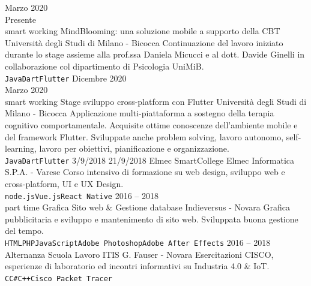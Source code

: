 \documentclass[9pt]{developercv}
\begin{document}
\begin{entrylist}
	\entry
		{Marzo 2020 \\ Presente \\\footnotesize{smart working}}
		{MindBlooming: una soluzione mobile a supporto della CBT}
		{Università degli Studi di Milano - Bicocca}
		{Continuazione del lavoro iniziato durante lo stage assieme alla prof.ssa Daniela Micucci e al dott. Davide Ginelli in collaborazione col dipartimento di Psicologia UniMiB. \\ \texttt{Java}\slashsep\texttt{Dart}\slashsep\texttt{Flutter}}
	\entry
		{Dicembre 2020 \\ Marzo 2020\\\footnotesize{smart working}}
		{Stage sviluppo cross-platform con Flutter}
		{Università degli Studi di Milano - Bicocca}
		{Applicazione multi-piattaforma a sostegno della terapia cognitivo comportamentale. Acquisite ottime conoscenze dell'ambiente mobile e del framework Flutter. Sviluppate anche problem solving, lavoro autonomo, self-learning, lavoro per obiettivi, pianificazione e organizzazione. \\ \texttt{Java}\slashsep\texttt{Dart}\slashsep\texttt{Flutter}}
	\entry
		{3/9/2018  21/9/2018}
		{Elmec SmartCollege}
		{Elmec Informatica S.P.A. - Varese}
		{Corso intensivo di formazione su web design, sviluppo web e cross-platform, UI e UX Design. \\ \texttt{node.js}\slashsep\texttt{Vue.js}\slashsep\texttt{React Native}}
	\entry
		{2016 -- 2018\\\footnotesize{part time}}
		{Grafica Sito web \& Gestione database}
		{Indieversus - Novara}
		{Grafica pubblicitaria e sviluppo e mantenimento di sito web. Sviluppata buona gestione del tempo. \\ \texttt{HTML}\slashsep\texttt{PHP}\slashsep\texttt{JavaScript}\slashsep\texttt{Adobe Photoshop}\slashsep\texttt{Adobe After Effects}}
	\entry
		{2016 -- 2018}
		{Alternanza Scuola Lavoro}
		{ITIS G. Fauser - Novara}
		{Esercitazioni CISCO, esperienze di laboratorio ed incontri informativi su Industria 4.0 \& IoT. \\ \texttt{C}\slashsep\texttt{C\#}\slashsep\texttt{C++}\slashsep\texttt{Cisco Packet Tracer}}
\end{entrylist}


\end{document}
